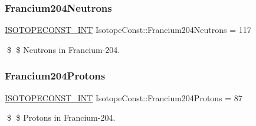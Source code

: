 \subsubsection{\texorpdfstring{Francium204\+Neutrons}{Francium204Neutrons}}
{\footnotesize\ttfamily \mbox{\hyperlink{group___isotope_const-_macros_ga5f18360b3e99483a35c32d789e62621c}{I\+S\+O\+T\+O\+P\+E\+C\+O\+N\+S\+T\+\_\+\+I\+NT}} Isotope\+Const\+::\+Francium204\+Neutrons = 117}

\$ \$ Neutrons in Francium-\/204. \mbox{\label{group___isotope_const-_francium-_fr204_ga9c3195fe65857d4aac22b0f7b204bdce}} 
\subsubsection{\texorpdfstring{Francium204\+Protons}{Francium204Protons}}
{\footnotesize\ttfamily \mbox{\hyperlink{group___isotope_const-_macros_ga5f18360b3e99483a35c32d789e62621c}{I\+S\+O\+T\+O\+P\+E\+C\+O\+N\+S\+T\+\_\+\+I\+NT}} Isotope\+Const\+::\+Francium204\+Protons = 87}

\$ \$ Protons in Francium-\/204. 